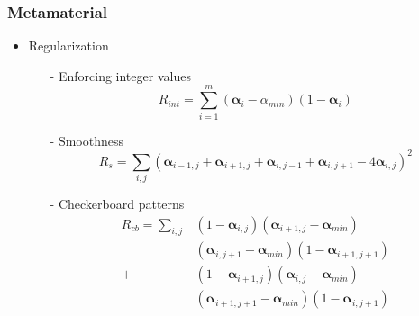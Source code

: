 \documentclass[serif,mathserif]{beamer}
\newcommand{\BOLDG}[1]{\boldsymbol{#1}}
\begin{document}
\begin{frame}
  \frametitle{Metamaterial}
  \begin{itemize}
  \item Regularization
    \begin{itemize}
    \item[-] Enforcing integer values
      \begin{equation*}
        R_{int} = \sum_{i=1}^m (\BOLDG{\alpha}_i-\alpha_{min})(1-\BOLDG{\alpha}_i)
      \end{equation*}
      \pause
    \item[-] Smoothness
      \begin{equation*}
        R_s = \sum_{i, j} (\BOLDG{\alpha}_{i-1, j}+\BOLDG{\alpha}_{i+1, j}
        +\BOLDG{\alpha}_{i, j-1}+\BOLDG{\alpha}_{i, j+1}-4\BOLDG{\alpha}_{i, j})^2
      \end{equation*}
      \pause
    \item[-] Checkerboard patterns
      \begin{equation*}
        \begin{split}
        R_{cb}= \sum_{i, j} &(1-\BOLDG{\alpha}_{i, j})(\BOLDG{\alpha}_{i+1, j}-\BOLDG{\alpha}_{min})\\
        &(\BOLDG{\alpha}_{i, j+1}-\BOLDG{\alpha}_{min})(1-\BOLDG{\alpha}_{i+1, j+1}) \\
        +&(1-\BOLDG{\alpha}_{i+1, j})(\BOLDG{\alpha}_{i, j}-\BOLDG{\alpha}_{min})\\
        &(\BOLDG{\alpha}_{i+1, j+1}-\BOLDG{\alpha}_{min})(1-\BOLDG{\alpha}_{i, j+1})
        \end{split}
      \end{equation*}
    \end{itemize}
  \end{itemize}
   {
  }
\end{frame}
\end{document}
